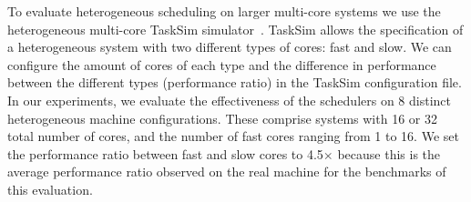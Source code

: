 



To evaluate heterogeneous scheduling on larger multi-core systems we use the heterogeneous multi-core TaskSim simulator~\cite{AbstrLevels_TACO12}. TaskSim allows the specification of a heterogeneous system with two different types of cores: fast and slow. We can configure the amount of cores of each type and the difference in performance between the different types (performance ratio) in the TaskSim configuration file.
In our experiments, we evaluate the effectiveness of the schedulers on 8 distinct heterogeneous machine configurations. These comprise systems with 16 or 32 total number of cores, and the number of fast cores ranging from 1 to 16. We set the performance ratio between fast and slow cores to 4.5$\times$ because this is the average performance ratio observed on the real machine for the benchmarks of this evaluation.

